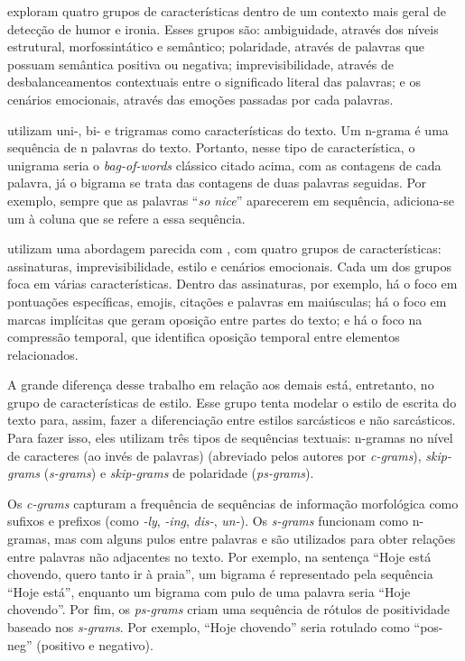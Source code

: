 \cite{reyes:2012:from-humor} exploram quatro grupos de características dentro de
um contexto mais geral de detecção de humor e ironia. Esses grupos são:
ambiguidade, através dos níveis estrutural, morfossintático e semântico;
polaridade, através de palavras que possuam semântica positiva ou negativa;
imprevisibilidade, através de desbalanceamentos contextuais entre o significado
literal das palavras; e os cenários emocionais, através das emoções passadas por
cada palavras.

\cite{liebrecht:2013:perfect-solution} utilizam uni-, bi- e trigramas como
características do texto. Um n-grama é uma sequência de n palavras do texto.
Portanto, nesse tipo de característica, o unigrama seria o \textit{bag-of-words}
clássico citado acima, com as contagens de cada palavra, já o bigrama se trata
das contagens de duas palavras seguidas. Por exemplo, sempre que as palavras
``\textit{so nice}'' aparecerem em sequência, adiciona-se um à coluna que se
refere a essa sequência.

\cite{reyes:2013:multidimensional-approach} utilizam uma abordagem parecida com
\cite{reyes:2012:from-humor}, com quatro grupos de características: assinaturas,
imprevisibilidade, estilo e cenários emocionais. Cada um dos grupos foca em
várias características. Dentro das assinaturas, por exemplo, há o foco em
pontuações específicas, emojis, citações e palavras em maiúsculas; há o foco em
marcas implícitas que geram oposição entre partes do texto; e há o foco na
compressão temporal, que identifica oposição temporal entre elementos
relacionados.

A grande diferença desse trabalho em relação aos demais está, entretanto, no
grupo de características de estilo. Esse grupo tenta modelar o estilo de escrita
do texto para, assim, fazer a diferenciação entre estilos sarcásticos e não
sarcásticos. Para fazer isso, eles utilizam três tipos de sequências textuais:
n-gramas no nível de caracteres (ao invés de palavras) (abreviado pelos autores
por \textit{c-grams}), \textit{skip-grams} (\textit{s-grams}) e
\textit{skip-grams} de polaridade (\textit{ps-grams}).

Os \textit{c-grams} capturam a frequência de sequências de informação
morfológica como sufixos e prefixos (como \textit{-ly}, \textit{-ing},
\textit{dis-}, \textit{un-}). Os \textit{s-grams} funcionam como n-gramas, mas
com alguns pulos entre palavras e são utilizados para obter relações entre
palavras não adjacentes no texto. Por exemplo, na sentença ``Hoje está chovendo,
quero tanto ir à praia'', um bigrama é representado pela sequência ``Hoje
está'', enquanto um bigrama com pulo de uma palavra seria ``Hoje chovendo''. Por
fim, os \textit{ps-grams} criam uma sequência de rótulos de positividade baseado
nos \textit{s-grams}. Por exemplo, ``Hoje chovendo'' seria rotulado como
``pos-neg'' (positivo e negativo).

